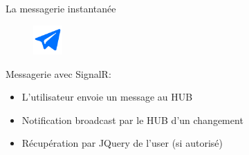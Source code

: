 \begin{frame}{La messagerie instantanée}
\begin{figure}[h!]
  \includegraphics[width=0.10\textwidth]{images/-59-512}
\end{figure}

  Messagerie avec SignalR:
  \begin{itemize}
  \item L'utilisateur envoie un message au HUB
  \item Notification broadcast par le HUB d'un changement
  \item Récupération par JQuery de l'user (si autorisé)
  \end{itemize}
\end{frame}